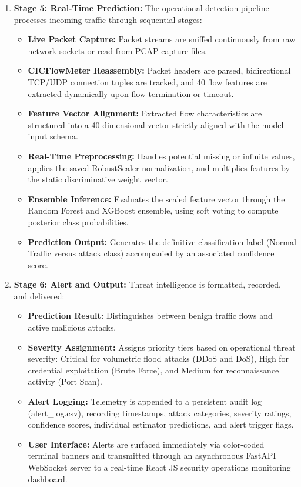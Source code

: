 \documentclass[12pt,a4paper]{report}
\begin{document}
\begin{enumerate}[leftmargin=*]
    \item \textbf{Stage 5: Real-Time Prediction:} The operational detection pipeline processes incoming traffic through sequential stages:
    \begin{itemize}[leftmargin=*,itemsep=2pt,topsep=2pt]
        \item \textbf{Live Packet Capture:} Packet streams are sniffed continuously from raw network sockets or read from PCAP capture files.
        \item \textbf{CICFlowMeter Reassembly:} Packet headers are parsed, bidirectional TCP/UDP connection tuples are tracked, and 40 flow features are extracted dynamically upon flow termination or timeout.
        \item \textbf{Feature Vector Alignment:} Extracted flow characteristics are structured into a 40-dimensional vector strictly aligned with the model input schema.
        \item \textbf{Real-Time Preprocessing:} Handles potential missing or infinite values, applies the saved RobustScaler normalization, and multiplies features by the static discriminative weight vector.
        \item \textbf{Ensemble Inference:} Evaluates the scaled feature vector through the Random Forest and XGBoost ensemble, using soft voting to compute posterior class probabilities.
        \item \textbf{Prediction Output:} Generates the definitive classification label (Normal Traffic versus attack class) accompanied by an associated confidence score.
    \end{itemize}

    \item \textbf{Stage 6: Alert and Output:} Threat intelligence is formatted, recorded, and delivered:
    \begin{itemize}[leftmargin=*,itemsep=2pt,topsep=2pt]
        \item \textbf{Prediction Result:} Distinguishes between benign traffic flows and active malicious attacks.
        \item \textbf{Severity Assignment:} Assigns priority tiers based on operational threat severity: Critical for volumetric flood attacks (DDoS and DoS), High for credential exploitation (Brute Force), and Medium for reconnaissance activity (Port Scan).
        \item \textbf{Alert Logging:} Telemetry is appended to a persistent audit log (alert\_log.csv), recording timestamps, attack categories, severity ratings, confidence scores, individual estimator predictions, and alert trigger flags.
        \item \textbf{User Interface:} Alerts are surfaced immediately via color-coded terminal banners and transmitted through an asynchronous FastAPI WebSocket server to a real-time React JS security operations monitoring dashboard.
    \end{itemize}
\end{enumerate}
\end{document}
